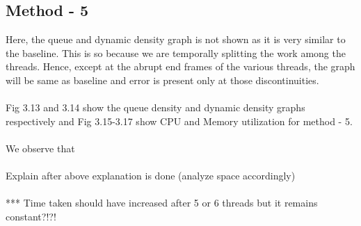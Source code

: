\documentclass[paper=a4, fontsize = 12pt]{scrartcl}
\numberwithin{equation}{section}		%
\numberwithin{figure}{section}			%
\numberwithin{table}{section}				%
\begin{document}
\subsection{Method - 5}

Here, the queue and dynamic density graph is not shown as it is very similar to the baseline. This is so because we are temporally splitting the work among the threads. Hence, except at the abrupt end frames of the various threads, the graph will be same as baseline and error is present only at those discontinuities. \\ \\
Fig 3.13 and 3.14 show the queue density and dynamic density graphs respectively and Fig 3.15-3.17 show CPU and Memory utilization for method - 5.\\ \\

We observe that \\\\
Explain after above explanation is done (analyze space accordingly)\\ \\ 
*** Time taken should have increased after 5 or 6 threads but it remains constant?!?!
\end{document}
